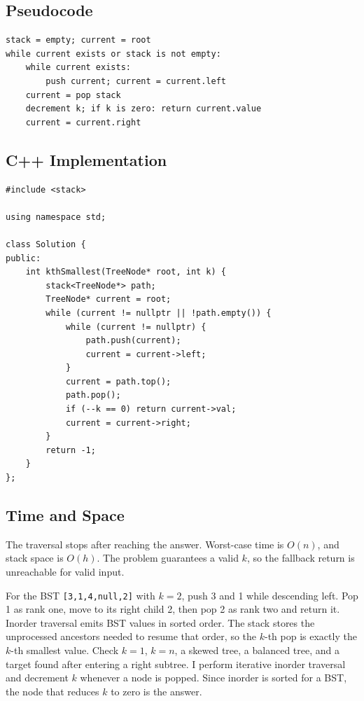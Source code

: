 \subsection{Pseudocode}
\begin{lstlisting}[style=pseudocode]
stack = empty; current = root
while current exists or stack is not empty:
    while current exists:
        push current; current = current.left
    current = pop stack
    decrement k; if k is zero: return current.value
    current = current.right
\end{lstlisting}

\subsection{C++ Implementation}
\begin{lstlisting}[style=compactcode,caption={Complete C++ solution: Kth Smallest in a BST}]
#include <stack>

using namespace std;

class Solution {
public:
    int kthSmallest(TreeNode* root, int k) {
        stack<TreeNode*> path;
        TreeNode* current = root;
        while (current != nullptr || !path.empty()) {
            while (current != nullptr) {
                path.push(current);
                current = current->left;
            }
            current = path.top();
            path.pop();
            if (--k == 0) return current->val;
            current = current->right;
        }
        return -1;
    }
};
\end{lstlisting}

\subsection{Time and Space}
The traversal stops after reaching the answer. Worst-case time is \(O(n)\),
and stack space is \(O(h)\). The problem guarantees a valid \(k\), so the
fallback return is unreachable for valid input.

\lessonexpansion
  {For the BST \texttt{[3,1,4,null,2]} with \(k=2\), push 3 and 1 while
   descending left. Pop 1 as rank one, move to its right child 2, then pop 2
   as rank two and return it.}
  {Inorder traversal emits BST values in sorted order. The stack stores the
   unprocessed ancestors needed to resume that order, so the \(k\)-th pop is
   exactly the \(k\)-th smallest value.}
  {Check \(k=1\), \(k=n\), a skewed tree, a balanced tree, and a target found
   after entering a right subtree.}
  {I perform iterative inorder traversal and decrement \(k\) whenever a node
   is popped. Since inorder is sorted for a BST, the node that reduces
   \(k\) to zero is the answer.}

